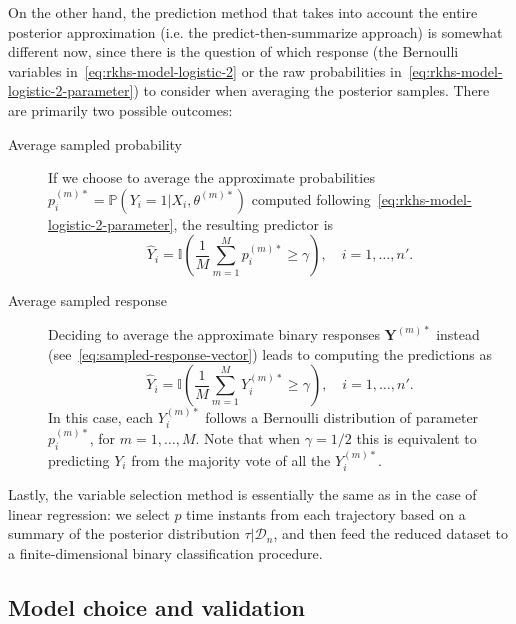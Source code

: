 \documentclass[ba]{imsart}
\numberwithin{equation}{section}
\theoremstyle{plain}
\begin{document}
On the other hand, the prediction method that takes into account the entire posterior approximation (i.e. the predict-then-summarize approach) is somewhat different now, since there is the question of which response (the Bernoulli variables in~\eqref{eq:rkhs-model-logistic-2} or the raw probabilities in~\eqref{eq:rkhs-model-logistic-2-parameter}) to consider when averaging the posterior samples. There are primarily two possible outcomes:
\begin{description}
  \item[Average sampled probability] If we choose to average the approximate probabilities \(p_i^{(m)*} = \mathbb P(Y_i =1 | X_i,\theta^{(m)*})\) computed following~\eqref{eq:rkhs-model-logistic-2-parameter}, the resulting predictor is
  \[
    \hat Y_i = \mathbb I\left(\frac{1}{M} \sum_{m=1}^M p_i^{(m)*} \geq \gamma\right), \quad i=1,\dots,n'.
  \]
  \item[Average sampled response] Deciding to average the approximate binary responses \(\bm Y^{(m)*}\) instead (see~\eqref{eq:sampled-response-vector}) leads to computing the predictions as
\[
  \hat Y_i = \mathbb I\left(\frac{1}{M} \sum_{m=1}^M Y_i^{(m)*} \geq \gamma\right), \quad i=1,\dots,n'.
\]
In this case, each \(Y_i^{(m)*}\) follows a Bernoulli distribution of parameter \(p_i^{(m)*}\), for \(m=1,\dots,M\). Note that when \(\gamma=1/2\) this is equivalent to predicting \(Y_i\) from the majority vote of all the \(Y_i^{(m)*}\).
\end{description}

Lastly, the variable selection method is essentially the same as in the case of linear regression: we select \(p\) time instants from each trajectory based on a summary of the posterior distribution \(\tau | \mathcal D_n\), and then feed the reduced dataset to a finite-dimensional binary classification procedure.

\subsection{Model choice and validation}\label{sec:model-choice}
\end{document}
